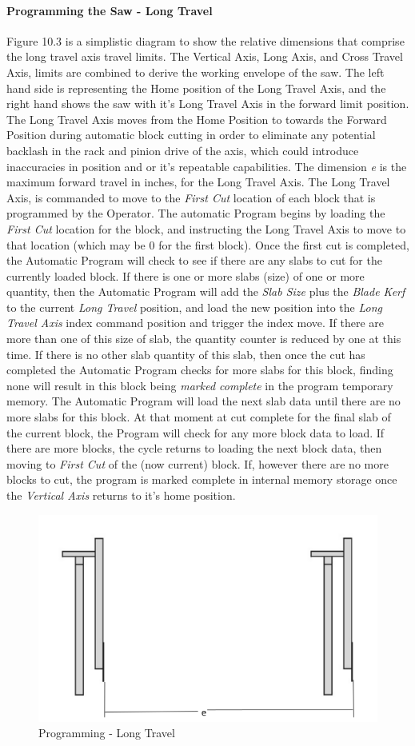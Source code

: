 \paragraph*{Programming the Saw - Long Travel}Figure 10.3 is a simplistic diagram to show the relative dimensions that comprise the long travel axis travel limits. The Vertical Axis, Long Axis, and Cross Travel Axis, limits are combined to derive the working envelope of the saw. The left hand side is representing the Home position of the Long Travel Axis, and the right hand shows the saw with it's Long Travel Axis in the forward limit position. The Long Travel Axis moves from the Home Position to towards the Forward Position during automatic block cutting in order to eliminate any potential backlash in the rack and pinion drive of the axis, which could introduce inaccuracies in position and or it's repeatable capabilities. The dimension \textit{e} is the maximum forward travel in inches, for the Long Travel Axis. The Long Travel Axis, is commanded to move to the \textit{First Cut} location of each block that is programmed by the Operator. The automatic Program begins by loading the \textit{First Cut} location for the block, and instructing the Long Travel Axis to move to that location (which may be 0 for the first block). Once the first cut is completed, the Automatic Program will check to see if there are any slabs to cut for the currently loaded block. If there is one or more slabs (size) of one or more quantity, then the Automatic Program will add the \textit{Slab Size} plus the \textit{Blade Kerf} to the current \textit{Long Travel} position, and load the new position into the \textit{Long Travel Axis} index command position and trigger the index move. If there are more than one of this size of slab, the quantity counter is reduced by one at this time. If there is no other slab quantity of this slab, then once the cut has completed the Automatic Program checks for more slabs for this block, finding none will result in this block being \textit{marked complete} in the program temporary memory. The Automatic Program will load the next slab data until there are no more slabs for this block. At that moment at cut complete for the final slab of the current block, the Program will check for any more block data to load. If there are more blocks, the cycle returns to loading the next block data, then moving to \textit{First Cut} of the (now current) block. If, however there are no more blocks to cut, the program is marked complete in internal memory storage once the \textit{Vertical Axis} returns to it's home position.
\begin{figure}
	\centering
	\includegraphics[width=0.5\linewidth]{screen-captures/program/kodiak-saw-long-travel}
	\caption{Programming - Long Travel}
	\label{fig:prg-long-travel}
\end{figure}